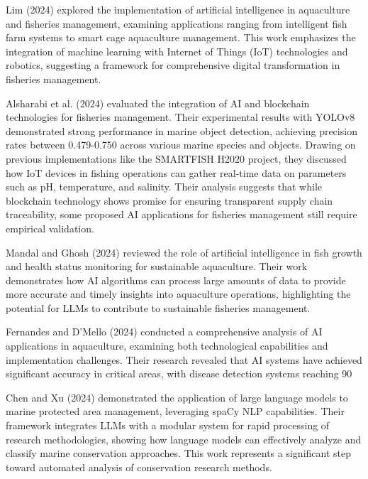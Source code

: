 Lim (2024) explored the implementation of artificial intelligence in aquaculture and fisheries management, examining applications ranging from intelligent fish farm systems to smart cage aquaculture management. This work emphasizes the integration of machine learning with Internet of Things (IoT) technologies and robotics, suggesting a framework for comprehensive digital transformation in fisheries management.

Alsharabi et al. (2024) evaluated the integration of AI and blockchain technologies for fisheries management. Their experimental results with YOLOv8 demonstrated strong performance in marine object detection, achieving precision rates between 0.479-0.750 across various marine species and objects. Drawing on previous implementations like the SMARTFISH H2020 project, they discussed how IoT devices in fishing operations can gather real-time data on parameters such as pH, temperature, and salinity. Their analysis suggests that while blockchain technology shows promise for ensuring transparent supply chain traceability, some proposed AI applications for fisheries management still require empirical validation.

Mandal and Ghosh (2024) reviewed the role of artificial intelligence in fish growth and health status monitoring for sustainable aquaculture. Their work demonstrates how AI algorithms can process large amounts of data to provide more accurate and timely insights into aquaculture operations, highlighting the potential for LLMs to contribute to sustainable fisheries management.

Fernandes and D'Mello (2024) conducted a comprehensive analysis of AI applications in aquaculture, examining both technological capabilities and implementation challenges. Their research revealed that AI systems have achieved significant accuracy in critical areas, with disease detection systems reaching 90%

Chen and Xu (2024) demonstrated the application of large language models to marine protected area management, leveraging spaCy NLP capabilities. Their framework integrates LLMs with a modular system for rapid processing of research methodologies, showing how language models can effectively analyze and classify marine conservation approaches. This work represents a significant step toward automated analysis of conservation research methods.


